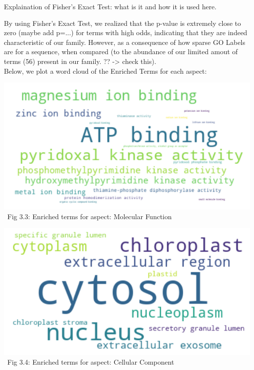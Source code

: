 \documentclass[10pt,twocolumn,letterpaper]{article}
\begin{document}
Explaination of Fisher's Exact Test: what is it and how it is used here.

By using Fisher's Exact Test, we realized that the p-value is extremely close to zero (maybe add p=...) for terms with high odds, indicating that they are indeed characteristic of our family. However, as a consequence of how sparse GO Labels are for a sequence, when compared (to the abundance of our limited amout of terms (56) present in our family. ?? -> check this). \\



Below, we plot a word cloud of the Enriched Terms for each aspect:

\begin{center}
    \includegraphics[scale=0.30]{report/img/word_cloud_mf.png} \\
    \
    \small{Fig 3.3: Enriched terms for aspect: Molecular Function}
\end{center}

\begin{center}
    \includegraphics[scale=0.30]{report/img/word_cloud_cc.png} \\
    \
    \small{Fig 3.4: Enriched terms for aspect: Cellular Component}
\end{center}
\end{document}

